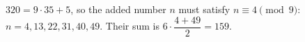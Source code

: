 $320=9\cdot35+5$, so the added number $n$ must satisfy $n\equiv4\pmod9$: $n=4,13,22,31,40,49$. Their sum is $6\cdot\dfrac{4+49}{2}=\boxed{159}$.
